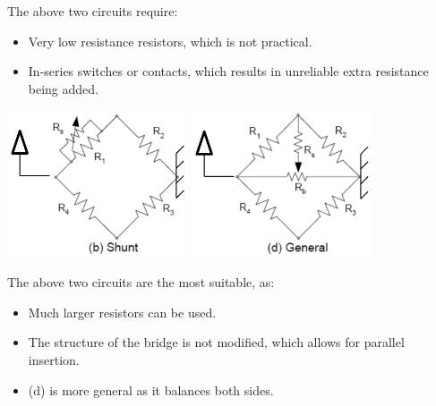 \documentclass[11pt]{article}
\begin{document}
The above two circuits require:
\begin{itemize}
\item Very low resistance resistors, which is not practical.
\item In-series switches or contacts, which results in unreliable extra resistance being added.
\end{itemize}

\begin{center}
\includegraphics[width=0.40\textwidth]{./images/bridge-balancing-shunt-circuit-diagram.png}
\includegraphics[width=0.40\textwidth]{./images/bridge-balancing-general-circuit-diagram.png}
\end{center}

The above two circuits are the most suitable, as:
\begin{itemize}
\item Much larger resistors can be used.
\item The structure of the bridge is not modified, which allows for parallel insertion.
\item (d) is more general as it balances both sides.
\end{itemize}
\end{document}
